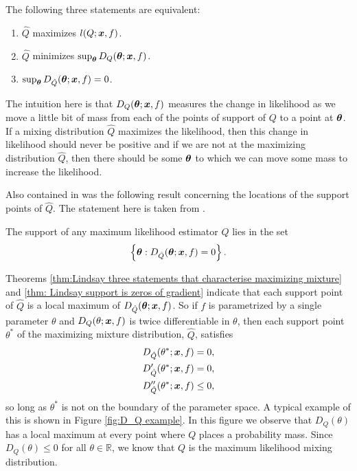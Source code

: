 	\begin{theorem}
	\label{thm:Lindsay three statements that characterise maximizing mixture}
		The following three statements are equivalent:
		\begin{enumerate}
			\item $\hat{Q}$ maximizes $l(Q;{\bm{{x}}},f)$.
			\item $\hat{Q}$ minimizes $\sup_{\bm{{\theta}}} D_Q({\bm{{\theta}}};{\bm{{x}}}, f)$.
			\item $\sup_{\bm{{\theta}}} D_{\hat{Q}}({\bm{{\theta}}};{\bm{{x}}}, f) = 0$.
			\label{item:supremum of gradient is zero}
		\end{enumerate}
	\end{theorem}

	The intuition here is that $D_Q({\bm{{\theta}}}; {\bm{{x}}}, f)$ measures the change in likelihood as we move a little bit of mass from each of the points of support of $Q$ to a point at ${\bm{{\theta}}}$. If a mixing distribution $\hat{Q}$ maximizes the likelihood, then this change in likelihood should never be positive and if we are not at the maximizing distribution $\hat{Q}$, then there should be some ${\bm{{\theta}}}$ to which we can move some mass to increase the likelihood.


	Also contained in \cite[Theorem 4.1]{Lindsay1983-tf} was the following result concerning the locations of the support points of $\hat{Q}$. The statement here is taken from \cite[Theorem 20]{Lindsay1995-sq}.

	\begin{theorem}
		\label{thm: Lindsay support is zeros of gradient}
		The support of any maximum likelihood estimator $\hat{Q}$ lies in the set 
		\begin{equation}
			\left\{{\bm{{\theta}}} : D_{\hat{Q}}({\bm{{\theta}}};{\bm{{x}}},f) = 0 \right\}.
			\label{eq:set D_Q = 0}
		\end{equation}
	\end{theorem}

	Theorems \ref{thm:Lindsay three statements that characterise maximizing mixture} and \ref{thm: Lindsay support is zeros of gradient} indicate that each support point of $\hat{Q}$ is a local maximum of $D_{\hat{Q}}({\bm{{\theta}}}; {\bm{{x}}}, f)$. So if $f$ is parametrized by a single parameter $\theta$ and $D_Q(\theta;{\bm{{x}}},f)$ is twice differentiable in $\theta$, then each support point $\theta^*$ of the maximizing mixture distribution, $\hat{Q}$, satisfies
	\begin{align}
		D_{\hat{Q}}(\theta^*;{\bm{{x}}}, f) &= 0, 
		\label{eq:Deq1}\\
		D'_{\hat{Q}}(\theta^*;{\bm{{x}}}, f) &= 0, 
		\label{eq:Deq2}\\
		D''_{\hat{Q}}(\theta^*;{\bm{{x}}}, f) &\leq 0,
		\label{eq:Deq3}
	\end{align}
	so long as $\theta^*$ is not on the boundary of the parameter space. A typical example of this is shown in Figure \ref{fig:D_Q example}. In this figure we observe that $D_Q(\theta)$ has a local maximum at every point where $Q$ places a probability mass. Since $D_Q(\theta) \leq 0$ for all $\theta \in \mathbb{R}$, we know that $Q$ is the maximum likelihood mixing distribution.

